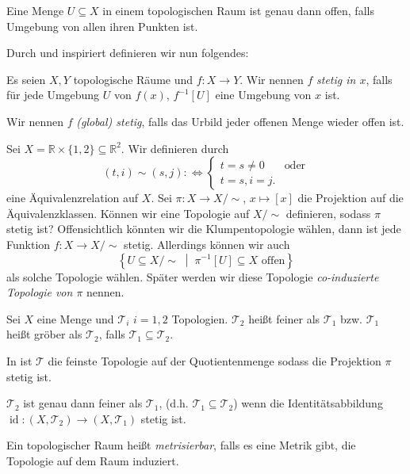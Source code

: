 \documentclass[
12pt, 
openany, 
a4paper, 
final,
fleqn, 
]{myclass}
\numberwithin{equation}{chapter}
\numberwithin{section}{chapter}
\newcommand{\RR}{\mathbb R}
\newcommand{\varT}{\mathcal T}
\newcommand{\set}[2]{\left\{#1\;\middle|\;#2\right\}}
\DeclareMathOperator{\id}{id}
\begin{document}
\begin{rmk}
Eine Menge $U\subseteq X$ in einem topologischen Raum ist genau dann offen, falls Umgebung von allen ihren Punkten ist. 
\end{rmk}
Durch  und  inspiriert definieren wir nun folgendes: 
\begin{defn}\label{1.18}
Es seien $X, Y$ topologische Räume und $f: X\to Y$. Wir nennen $f$ \emph{stetig in $x$}, falls für jede Umgebung $U$ von $f(x)$, $f^{-1}[U]$ eine Umgebung von $x$ ist. 

Wir nennen $f$ \emph{(global) stetig}, falls das Urbild jeder offenen Menge wieder offen ist. 
\end{defn}
\begin{eg}\label{1.19}
Sei $X= \RR \times \{1, 2\} \subseteq \RR^2$. Wir definieren durch 
\[
(t, i) \sim (s, j) : \iff \begin{cases}
t=s \neq 0 & \text{oder}\\
t=s, i=j.  
\end{cases}
\]eine Äquivalenzrelation auf $X$. Sei $\pi: X \to X / \sim$, $x\mapsto [x]$ die Projektion auf die Äquivalenzklassen. Können wir eine Topologie auf ${X/\sim}$ definieren, sodass $\pi$ stetig ist? Offensichtlich könnten wir die Klumpentopologie wählen, dann ist jede Funktion $f: X\to {X/\sim}$ stetig. Allerdings können wir auch 
\[
\set{U \subseteq {X/\sim}}{\pi^{-1}[U]\subseteq X \text{ offen}}
\]
als solche Topologie wählen. Später werden wir diese Topologie \emph{co-induzierte Topologie von $\pi$} nennen.
\end{eg}
\begin{defn}\label{1.20}
Sei $X$ eine Menge und $\varT_i$ $i=1,2$ Topologien. $\varT_2$ heißt feiner als $\varT_1$ bzw. $\varT_1$ heißt gröber als $\varT_2$, falls $\varT_1 \subseteq \varT_2$. 
\end{defn}
In  ist $\varT $ die feinste Topologie auf der Quotientenmenge sodass die Projektion $\pi$ stetig ist. 
\begin{rmk}\label{1.20.5}
$\varT_2$ ist genau dann feiner als $\varT_1$, (d.h. $\varT_1 \subseteq \varT_2$) wenn die Identitätsabbildung $\id:(X, \varT_2) \to (X, \varT_1)$ stetig ist. 
\end{rmk}
\begin{defn}\label{1.21}
Ein topologischer Raum heißt \emph{metrisierbar}, falls es eine Metrik gibt, die Topologie auf dem Raum induziert. 
\end{defn}
\end{document}
